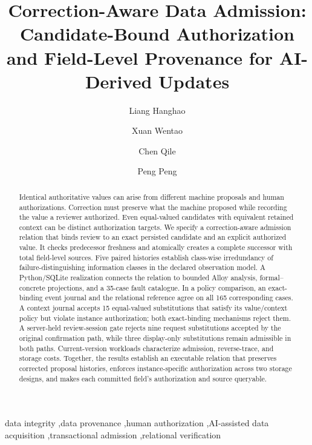 \documentclass[preprint,12pt,authoryear]{elsarticle}
\begin{document}
\begin{frontmatter}

\title{Correction-Aware Data Admission: Candidate-Bound Authorization and Field-Level Provenance for AI-Derived Updates}

\author[inst1]{Liang Hanghao}
\author[inst1]{Xuan Wentao}
\author[inst1]{Chen Qile}
\author[inst1]{Peng Peng}

\begin{abstract}
Identical authoritative values can arise from different machine proposals and human authorizations. Correction must preserve what the machine proposed while recording the value a reviewer authorized. Even equal-valued candidates with equivalent retained context can be distinct authorization targets. We specify a correction-aware admission relation that binds review to an exact persisted candidate and an explicit authorized value. It checks predecessor freshness and atomically creates a complete successor with total field-level sources. Five paired histories establish class-wise irredundancy of failure-distinguishing information classes in the declared observation model. A Python/SQLite realization connects the relation to bounded Alloy analysis, formal--concrete projections, and a 35-case fault catalogue. In a policy comparison, an exact-binding event journal and the relational reference agree on all 165 corresponding cases. A context journal accepts 15 equal-valued substitutions that satisfy its value/context policy but violate instance authorization; both exact-binding mechanisms reject them. A server-held review-session gate rejects nine request substitutions accepted by the original confirmation path, while three display-only substitutions remain admissible in both paths. Current-version workloads characterize admission, reverse-trace, and storage costs. Together, the results establish an executable relation that preserves corrected proposal histories, enforces instance-specific authorization across two storage designs, and makes each committed field's authorization and source queryable.
\end{abstract}

\begin{keyword}
data integrity \sep data provenance \sep human authorization \sep AI-assisted data acquisition \sep transactional admission \sep relational verification
\end{keyword}

\end{frontmatter}
\end{document}

